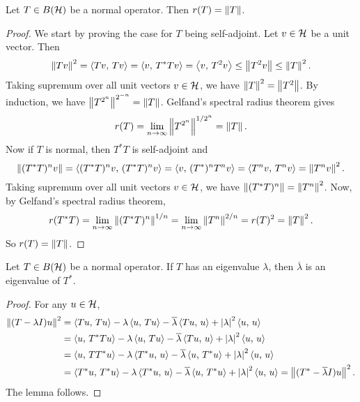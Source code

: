 \begin{lemma}\label{lem:normal_spectral_radius}
    Let $T\in B(\H)$ be a normal operator. Then $r(T) = \norm{T}$. 
\end{lemma}
\begin{proof}
    We start by proving the case for $T$ being self-adjoint. Let 
    $v\in\H$ be a unit vector. Then
    \begin{equation*}
        \norm{Tv}^2 = \inp{Tv}{Tv} = \inp{v}{T^*Tv} = \inp{v}{T^2v} 
        \leq \norm{T^2v} \leq \norm{T}^2.
    \end{equation*}
    Taking supremum over all unit vectors $v\in\H$, we have 
    $\norm{T}^2 = \norm{T^2}$. By induction, we have $\norm{T^{2^n}}^{2^{-n}} = \norm{T}$. 
    Gelfand's spectral radius theorem gives 
    \begin{equation*}
        r(T) = \lim_{n\to\infty}\norm{T^{2^n}}^{1/2^n} = \norm{T}.
    \end{equation*}
    Now if $T$ is normal, then $T^*T$ is self-adjoint and 
    \begin{equation*}
        \norm{(T^*T)^nv} = \inp{(T^*T)^nv}{(T^*T)^nv} = \inp{v}{(T^*)^nT^nv} 
        = \inp{T^nv}{T^nv} = \norm{T^nv}^2.
    \end{equation*}
    Taking supremum over all unit vectors $v\in\H$, we have $\norm{(T^*T)^n} = \norm{T^n}^2$. 
    Now, by Gelfand's spectral radius theorem, 
    \begin{equation*}
        r(T^*T) = \lim_{n\to\infty}\norm{(T^*T)^n}^{1/n} = \lim_{n\to\infty}\norm{T^n}^{2/n} = r(T)^2 = \norm{T}^2.
    \end{equation*}
    So $r(T) = \norm{T}$. 
\end{proof}

\begin{lemma}\label{lem:adjoint_eigenvalue}
    Let $T\in B(\H)$ be a normal operator. 
    If $T$ has an eigenvalue $\lambda$, then $\overline{\lambda}$ is an 
    eigenvalue of $T^*$.
\end{lemma}
\begin{proof}
    For any $u\in\H$, 
    \begin{equation*}
        \begin{split}
            \norm{(T-\lambda I)u}^2 &= \inp{Tu}{Tu} - \lambda\inp{u}{Tu} 
            - \overline{\lambda}\inp{Tu}{u} + \abs{\lambda}^2\inp{u}{u} \\
            &= \inp{u}{T^*Tu} - \lambda\inp{u}{Tu} - \overline{\lambda}\inp{Tu}{u} 
            + \abs{\lambda}^2\inp{u}{u} \\
            &= \inp{u}{TT^*u} - \lambda\inp{T^*u}{u} - \overline{\lambda}\inp{u}{T^*u} 
            + \abs{\lambda}^2\inp{u}{u} \\ 
            &= \inp{T^*u}{T^*u} - \lambda\inp{T^*u}{u} - \overline{\lambda}\inp{u}{T^*u} 
            + \abs{\lambda}^2\inp{u}{u} 
            = \norm{(T^*-\overline{\lambda}I)u}^2.
        \end{split}
    \end{equation*}
    The lemma follows. 
\end{proof}

